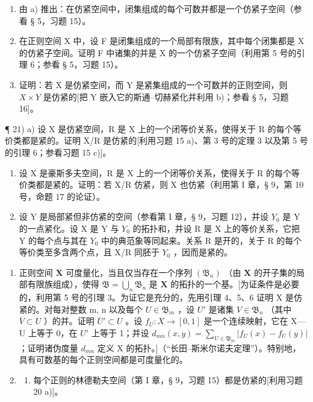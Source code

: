 \begin{enumerate}
\def\labelenumi{\alph{enumi})}
\setcounter{enumi}{1}
\item
  由 a) 推出：在仿紧空间中，闭集组成的每个可数并都是一个仿紧子空间（参看 § 5，习题 15）。
\item
  在正则空间 X 中，设 F 是闭集组成的一个局部有限族，其中每个闭集都是 X 的仿紧子空间。证明 F 中诸集的并是 X 的一个仿紧子空间（利用第 5 号的引理 6；参看 § 5，习题 15）。
\item
  证明：若 X 是仿紧空间，而 Y 是紧集组成的一个可数并的正则空间，则 \(X \times Y\) 是仿紧的{[}把 Y 嵌入它的斯通–切赫紧化并利用 b)；参看 § 5，习题 16{]}。
\end{enumerate}

¶ 21) a) 设 X 是仿紧空间，R 是 X 上的一个闭等价关系，使得关于 R 的每个等价类都是紧的。证明 X/R 是仿紧的{[}利用习题 15 a)、第 3 号的定理 3 以及第 5 号的引理 6；参看习题 15 c){]}。

\begin{enumerate}
\def\labelenumi{\alph{enumi})}
\setcounter{enumi}{1}
\item
  设 X 是豪斯多夫空间，R 是 X 上的一个闭等价关系，使得关于 R 的每个等价类都是紧的。证明：若 X/R 仿紧，则 X 也仿紧（利用第 I 章，§ 9，第 10 号，命题 17 的论证）。
\item
  设 Y 是局部紧但非仿紧的空间（参看第 I 章，§ 9，习题 12），并设 \(Y_{0}\) 是 Y 的一点紧化。设 X 是 Y 与 \(Y_{0}\) 的拓扑和，并设 R 是 X 上的等价关系，它把 Y 的每个点与其在 \(Y_{0}\) 中的典范象等同起来。关系 R 是开的，关于 R 的每个等价类至多含两个点，且 X/R 同胚于 \(Y_{0}\) ，因而是紧的。
\end{enumerate}

\begin{enumerate}
\def\labelenumi{\arabic{enumi})}
\setcounter{enumi}{21}
\item
  正则空间 \(\mathbf{X}\) 可度量化，当且仅当存在一个序列 \((\mathfrak{B}_n)\) （由 \(\mathbf{X}\) 的开子集的局部有限族组成），使得 \(\mathfrak{B} = \bigcup_{n} \mathfrak{B}_n\) 是 \(\mathbf{X}\) 的拓扑的一个基。{[}为证条件是必要的，利用第 5 号的引理 3。为证它是充分的，先用引理 4、5、6 证明 X 是仿紧的。对每对整数 m, n 以及每个 \(U \in \mathfrak{B}_{m}\) ，设 \(U'\) 是诸集 \(V \in \mathfrak{B}_{n}\) （其中 \(\overline{V} \subset U\) ）的并。证明 \(\overline{U}' \subset U\) 。设 \(f_{U}: X \to [0, 1]\) 是一个连续映射，它在 X---U 上等于 0，在 \(U'\) 上等于 1；并设 \(d_{mn}(x, y) = \sum_{U \in \mathfrak{B}_{m}} |f_{U}(x) - f_{U}(y)|\) ；证明诸伪度量 \(d_{mn}\) 定义 X 的拓扑。{]}（``长田–斯米尔诺夫定理''）。特别地，具有可数基的每个正则空间都是可度量化的。
\item
  \begin{enumerate}
  \def\labelenumii{\alph{enumii})}
  \tightlist
  \item
    每个正则的林德勒夫空间（第 I 章，§ 9，习题 15）都是仿紧的{[}利用习题 20 a){]}。
  \end{enumerate}
\end{enumerate}

